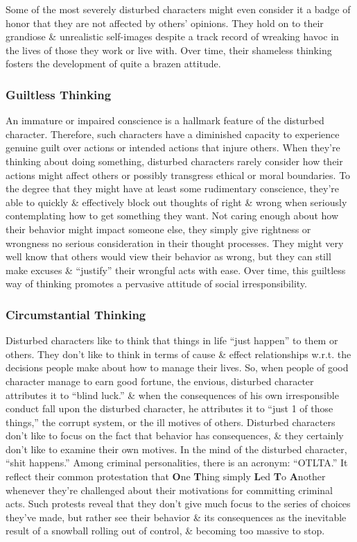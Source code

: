 \documentclass{article}
\numberwithin{equation}{section}
\begin{document}
Some of the most severely disturbed characters might even consider it a badge of honor that they are not affected by others' opinions. They hold on  to their grandiose \& unrealistic self-images despite a track record of wreaking havoc in the lives of those they work or live with. Over time, their shameless thinking fosters the development of quite a brazen attitude.

\subsubsection{Guiltless Thinking}
An immature or impaired conscience is a hallmark feature of the disturbed character. Therefore, such characters have a diminished capacity to experience genuine guilt over actions or intended actions that injure others. When they're thinking about doing something, disturbed characters rarely consider how their actions might affect others or possibly transgress ethical or moral boundaries. To the degree that they might have at least some rudimentary conscience, they're able to quickly \& effectively block out thoughts of right \& wrong when seriously contemplating how to get something they want. Not caring enough about how their behavior might impact someone else, they simply give rightness or wrongness no serious consideration in their thought processes. They might very well know that others would view their behavior as wrong, but they can still make excuses \& ``justify'' their wrongful acts with ease. Over time, this guiltless way of thinking promotes a pervasive attitude of social irresponsibility.

\subsubsection{Circumstantial Thinking}
Disturbed characters like to think that things in life ``just happen'' to them or others. They don't like to think in terms of cause \& effect relationships w.r.t. the decisions people make about how to manage their lives. So, when people of good character manage to earn good fortune, the envious, disturbed character attributes it to ``blind luck.'' \& when the consequences of his own irresponsible conduct fall upon the disturbed character, he attributes it to ``just 1 of those things,'' the corrupt system, or the ill motives of others. Disturbed characters don't like to focus on the fact that behavior has consequences, \& they certainly don't like to examine their own motives. In the mind of the disturbed character, ``shit happens.'' Among criminal personalities, there is an acronym: ``OTLTA.'' It reflect their common protestation that \textbf{O}ne \textbf{T}hing simply \textbf{L}ed \textbf{T}o \textbf{A}nother whenever they're challenged about their motivations for committing criminal acts. Such protests reveal that they don't give much focus to the series of choices they've made, but rather see their behavior \& its consequences as the inevitable result of a snowball rolling out of control, \& becoming too massive to stop.
\end{document}

